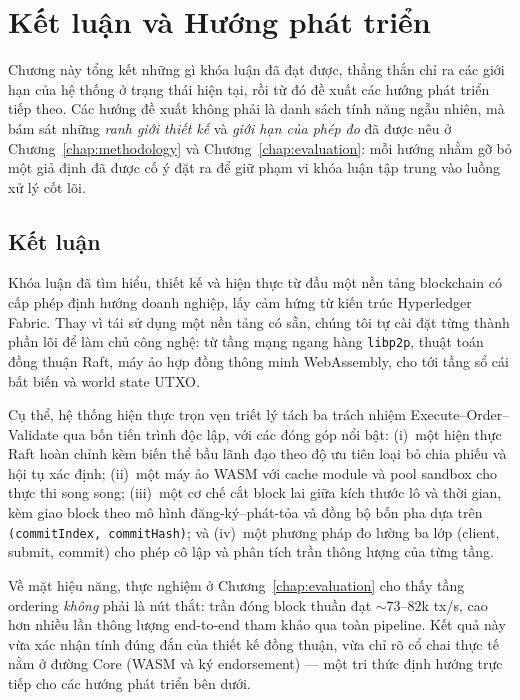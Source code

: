 \chapter{Kết luận và Hướng phát triển}
\label{chap:future-work}

Chương này tổng kết những gì khóa luận đã đạt được, thẳng thắn chỉ ra các giới
hạn của hệ thống ở trạng thái hiện tại, rồi từ đó đề xuất các hướng phát triển
tiếp theo. Các hướng đề xuất không phải là danh sách tính năng ngẫu nhiên, mà
bám sát những \textit{ranh giới thiết kế} và \textit{giới hạn của phép đo} đã
được nêu ở Chương~\ref{chap:methodology} và Chương~\ref{chap:evaluation}: mỗi
hướng nhằm gỡ bỏ một giả định đã được cố ý đặt ra để giữ phạm vi khóa luận tập
trung vào luồng xử lý cốt lõi.

\section{Kết luận}
\label{sec:conclusion}

Khóa luận đã tìm hiểu, thiết kế và hiện thực từ đầu một nền tảng
blockchain có cấp phép định hướng doanh nghiệp, lấy cảm hứng từ kiến trúc
Hyperledger Fabric. Thay vì tái sử dụng một nền tảng có sẵn, chúng tôi tự cài
đặt từng thành phần lõi để làm chủ công nghệ: từ tầng mạng ngang hàng
\texttt{libp2p}, thuật toán đồng thuận Raft, máy ảo hợp đồng thông minh
WebAssembly, cho tới tầng sổ cái bất biến và world state UTXO.

Cụ thể, hệ thống hiện thực trọn vẹn triết lý tách ba trách nhiệm
Execute--Order--Validate qua bốn tiến trình độc lập, với các đóng góp
nổi bật: (i)~một hiện thực Raft hoàn chỉnh kèm biến thể bầu lãnh đạo theo độ ưu
tiên loại bỏ chia phiếu và hội tụ xác định; (ii)~một máy ảo WASM với cache module
và pool sandbox cho thực thi song song; (iii)~một cơ chế cắt block lai giữa kích
thước lô và thời gian, kèm giao block theo mô hình đăng-ký--phát-tỏa và đồng bộ
bốn pha dựa trên \texttt{(commitIndex, commitHash)}; và (iv)~một phương pháp đo
lường ba lớp (client, submit, commit) cho phép cô lập và phân tích trần thông
lượng của từng tầng.

Về mặt hiệu năng, thực nghiệm ở Chương~\ref{chap:evaluation} cho thấy tầng
ordering \textit{không} phải là nút thắt: trần đóng block thuần đạt
${\sim}73$--$82$k tx/s, cao hơn nhiều lần thông lượng end-to-end tham khảo qua
toàn pipeline. Kết quả này vừa xác nhận tính đúng đắn của thiết kế đồng thuận,
vừa chỉ rõ cổ chai thực tế nằm ở đường Core (WASM và ký endorsement) --- một tri
thức định hướng trực tiếp cho các hướng phát triển bên dưới.

